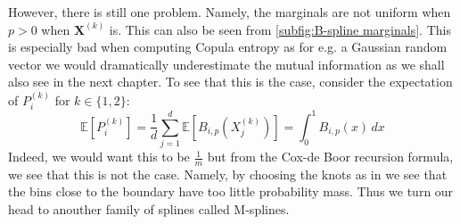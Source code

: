 \documentclass[../Thesis.tex]{subfiles}
\begin{document}
However, there is still one problem. Namely, the marginals are not uniform when $p > 0$ when $\boldsymbol X^{(k)}$ is. This can also be seen from \autoref{subfig:B-spline marginals}. This is especially bad when computing Copula entropy as for e.g. a Gaussian random vector we would dramatically underestimate the mutual information as we shall also see in the next chapter. To see that this is the case, consider the expectation of $P_i^{(k)}$ for $k\in \{1,2\}$:
$$\mathbb{E}\left[P_i^{(k)}\right] = \frac{1}{d} \sum_{j = 1}^{d}\mathbb{E}\left[B_{i,p}\left(X_j^{(k)}\right)\right] = \int_{0}^{1} B_{i,p}\left(x\right)\, dx$$
Indeed, we would want this to be $\frac{1}{m}$ but from the Cox-de Boor recursion formula, we see that this is not the case. Namely, by choosing the knots as in \cite{RePEc:plo:pbio00:0050008} we see that the bins close to the boundary have too little probability mass. Thus we turn our head to anouther family of splines called M-splines.
\end{document}
